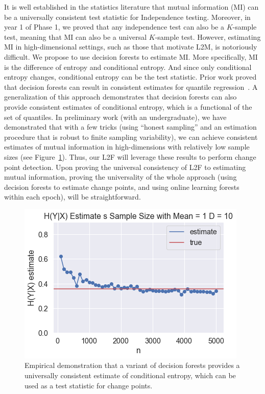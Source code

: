 \documentclass{article}
\begin{document}
It is well established in the statistics literature that mutual information (MI) can be a universally consistent test statistic for Independence testing.  Moreover, in year 1 of Phase 1, we proved that any independence test can also be a $K$-sample test, meaning that MI can also be a universal $K$-sample test. However, estimating MI in high-dimensional settings, such as those that motivate L2M, is notoriously difficult.  We propose to use decision forests to estimate MI.  More specifically,  MI is the difference of entropy and conditional entropy.  And since only conditional entropy changes, conditional entropy can be the test statistic.  Prior work proved that decision forests can result in consistent estimates for quantile regression~\cite{Meinhasser2006}.  A generalization of this approach demonstrates that decision forests can also provide consistent estimates of conditional entropy, which is a functional of the set of quantiles.  In preliminary work (with an undergraduate), we have demonstrated that with a few tricks (using ``honest sampling'' and an estimation procedure that is robust to finite sampling variability), we can achieve consistent estimates of mutual information in high-dimensions with relatively low sample sizes (see Figure~\ref{fig:cond_entropy}). Thus, our L2F will leverage these results to perform change point detection. Upon proving the universal consistency of L2F to estimating mutual information, proving the universality of the whole approach (using decision forests to estimate change points, and using online learning forests within each epoch), will be straightforward. 

\begin{figure}
    \centering
    \includegraphics{cond_entropy.png}
    \caption{Empirical demonstration that a variant of decision forests provides a universally consistent estimate of conditional entropy, which can be used as a test statistic for change points.}
    \label{fig:cond_entropy}
\end{figure}
\end{document}
